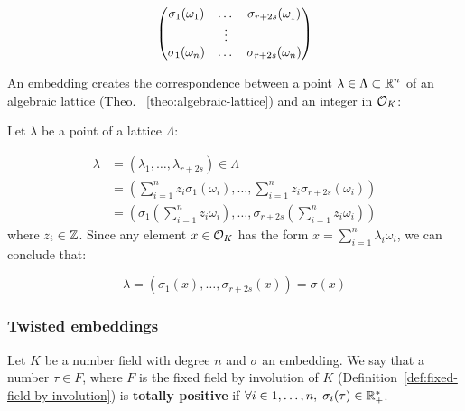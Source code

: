 \documentclass[a4paper,12pt]{article}
\begin{document}
\begin{equation}
  \label{def:gen-matrix-alg-lattices}
  \begin{pmatrix}
    \sigma_1(\omega_1) & $\dots$ &  \sigma_{r+2s}(\omega_1) \\
    & \vdots & \\
    \sigma_1(\omega_n) & $\dots$ & \sigma_{r+2s}(\omega_n) \\
  \end{pmatrix}  
\end{equation}

\begin{remark}\label{rem:lat-int-correspondence}
  An embedding creates the correspondence between a point $\lambda \in \Lambda \subset \mathbb{R}^n$ of an algebraic lattice (Theo.
 ~\ref{theo:algebraic-lattice}) and an integer in $\mathcal{O}_K$:

  Let $\lambda$ be a point of a lattice $\Lambda$:

\begin{align*} 
     \lambda &= (\lambda_1,\dots,\lambda_{r+2s}) \in \Lambda \\
       &= \left( \sum_{i=1}^n{z_i\sigma_1(\omega_i)} , \dots , \sum_{i=1}^n{z_i\sigma_{r+2s}(\omega_i)} \right) \\
       &= \left( \sigma_1\left(   \sum_{i=1}^n{z_i\omega_i} \right) , \dots , \sigma_{r+2s} \left( \sum_{i=1}^n{z_i\omega_i}  \right) \right) 
\end{align*}
  where $z_i \in \mathbb{Z}$. Since any element $x \in \mathcal{O}_K$ has the form $x =
  \sum_{i=1}^n{\lambda_i\omega_i}$, we can conclude that:

  \begin{equation*}
    \lambda = \left( \sigma_1(x), \dots, \sigma_{r+2s}(x) \right) = \sigma(x)
  \end{equation*}

\end{remark}

\subsubsection{Twisted embeddings}
\label{sec:org0e0927c}

\begin{definition}
  Let $K$ be a number field with degree $n$ and $\sigma$ an embedding. We say that a
  number $\tau \in F$, where $F$ is the fixed field by involution of $K$ (Definition~\ref{def:fixed-field-by-involution}) is \textbf{totally  positive} if $\forall i \in {1, \dots , n}, \; \sigma_i(\tau) \in \mathbb{R}^*_+$. 
\end{definition}
\end{document}
